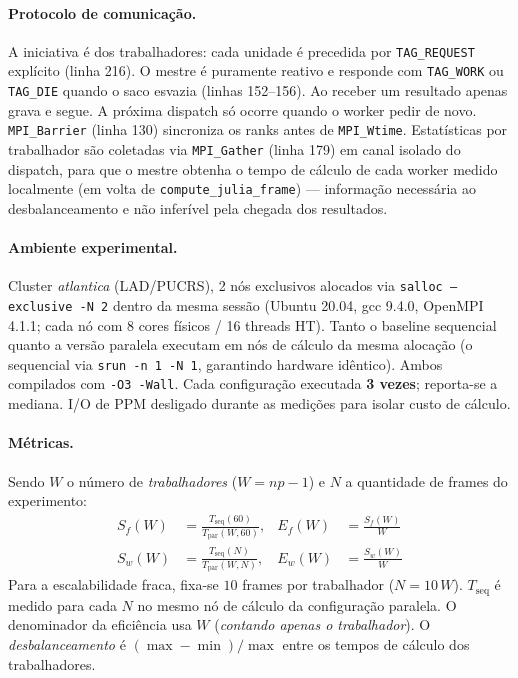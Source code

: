 \documentclass[twocolumn,a4paper,10pt]{article}
\begin{document}
\paragraph{Protocolo de comunicação.} A iniciativa é dos trabalhadores: cada unidade é precedida por \texttt{TAG\_REQUEST} explícito (linha 216). O mestre é puramente reativo e responde com \texttt{TAG\_WORK} ou \texttt{TAG\_DIE} quando o saco esvazia (linhas 152--156). Ao receber um resultado apenas grava e segue. A próxima dispatch só ocorre quando o worker pedir de novo. \texttt{MPI\_Barrier} (linha 130) sincroniza os ranks antes de \texttt{MPI\_Wtime}. Estatísticas por trabalhador são coletadas via \texttt{MPI\_Gather} (linha 179) em canal isolado do dispatch, para que o mestre obtenha o tempo de cálculo de cada worker medido localmente (em volta de \texttt{compute\_julia\_frame}) --- informação necessária ao desbalanceamento e não inferível pela chegada dos resultados.

\paragraph{Ambiente experimental.} Cluster \textit{atlantica} (LAD/PUCRS), 2 nós exclusivos alocados via \texttt{salloc --exclusive -N 2} dentro da mesma sessão (Ubuntu 20.04, gcc 9.4.0, OpenMPI 4.1.1; cada nó com 8 cores físicos / 16 threads HT). Tanto o baseline sequencial quanto a versão paralela executam em nós de cálculo da mesma alocação (o sequencial via \texttt{srun -n 1 -N 1}, garantindo hardware idêntico). Ambos compilados com \texttt{-O3 -Wall}. Cada configuração executada \textbf{3 vezes}; reporta-se a mediana. I/O de PPM desligado durante as medições para isolar custo de cálculo.

\paragraph{Métricas.} Sendo $W$ o número de \emph{trabalhadores} ($W = np - 1$) e $N$ a quantidade de frames do experimento:
\begin{align*}
S_f(W) &= \frac{T_{\text{seq}}(60)}{T_{\text{par}}(W,60)}, &
E_f(W) &= \frac{S_f(W)}{W} \\
S_w(W) &= \frac{T_{\text{seq}}(N)}{T_{\text{par}}(W,N)}, &
E_w(W) &= \frac{S_w(W)}{W}
\end{align*}
Para a escalabilidade fraca, fixa-se $10$ frames por trabalhador ($N = 10\,W$). $T_{\text{seq}}$ é medido para cada $N$ no mesmo nó de cálculo da configuração paralela. O denominador da eficiência usa $W$ (\emph{contando apenas o trabalhador}). O \emph{desbalanceamento} é $(\max - \min)/\max$ entre os tempos de cálculo dos trabalhadores.
\end{document}
